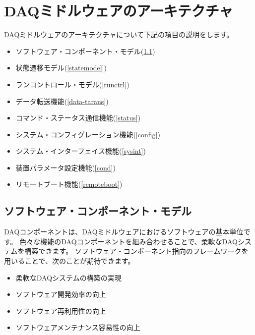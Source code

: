 \documentclass[a4j,10pt,dvips,onecolumn,oneside,final]{jarticle}%
\begin{document}
\section{DAQミドルウェアのアーキテクチャ}\label{arch}
DAQミドルウェアのアーキテクチャについて下記の項目の説明をします。
\begin{itemize}
\item ソフトウェア・コンポーネント・モデル(\ref{compmodel})
\item 状態遷移モデル(\ref{statemodel})
\item ランコントロール・モデル(\ref{runctrl})
\item データ転送機能(\ref{data-tarans})
\item コマンド・ステータス通信機能(\ref{status})
\item システム・コンフィグレーション機能(\ref{config})
\item システム・インターフェイス機能(\ref{sysint})
\item 装置パラメータ設定機能(\ref{cond})
\item リモートブート機能(\ref{remoteboot})
\end{itemize}

\subsection{ソフトウェア・コンポーネント・モデル}\label{compmodel}
DAQコンポーネントは、DAQミドルウェアにおけるソフトウェアの基本単位です。
色々な機能のDAQコンポーネントを組み合わせることで、柔軟なDAQシステムを構築できます。
ソフトウェア・コンポーネント指向のフレームワークを用いることで、次のことが期待できます。
\begin{itemize}
\item 柔軟なDAQシステムの構築の実現
\item ソフトウェア開発効率の向上
\item ソフトウェア再利用性の向上
\item ソフトウェアメンテナンス容易性の向上
\end{itemize}
\end{document}
